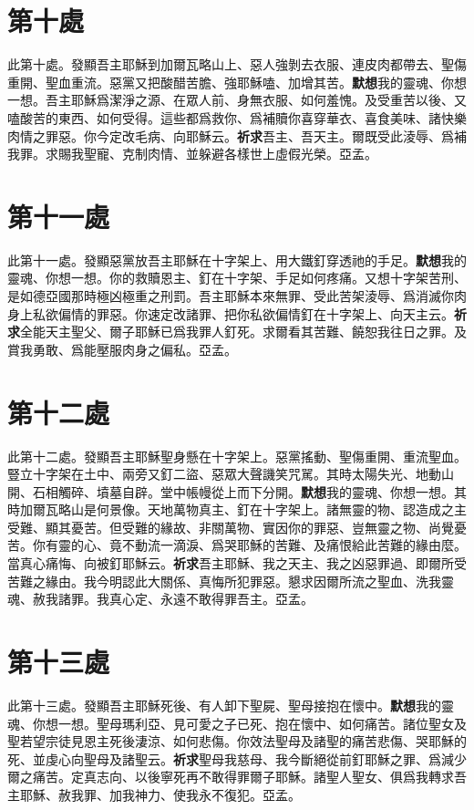 \section*{第十處}
此第十處。發顯吾主耶穌到加爾瓦略山上、惡人強剝去衣服、連皮肉都帶去、聖傷重開、聖血重流。惡黨又把酸醋苦膽、強耶穌嗑、加增其苦。\cspace\textbf{默想}我的靈魂、你想一想。吾主耶穌爲潔淨之源、在眾人前、身無衣服、如何羞愧。及受重苦以後、又嗑酸苦的東西、如何受得。這些都爲救你、爲補贖你喜穿華衣、喜食美味、諸快樂肉情之罪惡。你今定改毛病、向耶穌云。\cspace\textbf{祈求}吾主、吾天主。爾既受此淩辱、爲補我罪。求賜我聖寵、克制肉情、並躲避各樣世上虛假光榮。{\cspace}亞孟。

\section*{第十一處}
此第十一處。發顯惡黨放吾主耶穌在十字架上、用大鐵釘穿透祂的手足。\cspace\textbf{默想}我的靈魂、你想一想。你的救贖恩主、釘在十字架、手足如何疼痛。又想十字架苦刑、是如德亞國那時極凶極重之刑罰。吾主耶穌本來無罪、受此苦架淩辱、爲消滅你肉身上私欲偏情的罪惡。你速定改諸罪、把你私欲偏情釘在十字架上、向天主云。\cspace\textbf{祈求}全能天主聖父、爾子耶穌已爲我罪人釘死。求爾看其苦難、饒恕我往日之罪。及賞我勇敢、爲能壓服肉身之偏私。{\cspace}亞孟。

\section*{第十二處}
此第十二處。發顯吾主耶穌聖身懸在十字架上。惡黨搖動、聖傷重開、重流聖血。豎立十字架在土中、兩旁又釘二盜、惡眾大聲譏笑咒駡。其時太陽失光、地動山開、石相觸碎、墳墓自辟。堂中帳幔從上而下分開。\cspace\textbf{默想}我的靈魂、你想一想。其時加爾瓦略山是何景像。天地萬物真主、釘在十字架上。諸無靈的物、認造成之主受難、顯其憂苦。但受難的緣故、非關萬物、實因你的罪惡、豈無靈之物、尚覺憂苦。你有靈的心、竟不動流一滴淚、爲哭耶穌的苦難、及痛恨給此苦難的緣由麼。當真心痛悔、向被釘耶穌云。\cspace\textbf{祈求}吾主耶穌、我之天主、我之凶惡罪過、即爾所受苦難之緣由。我今明認此大關係、真悔所犯罪惡。懇求因爾所流之聖血、洗我靈魂、赦我諸罪。我真心定、永遠不敢得罪吾主。{\cspace}亞孟。

\section*{第十三處}
此第十三處。發顯吾主耶穌死後、有人卸下聖屍、聖母接抱在懷中。\cspace\textbf{默想}我的靈魂、你想一想。聖母瑪利亞、見可愛之子已死、抱在懷中、如何痛苦。諸位聖女及聖若望宗徒見恩主死後淒涼、如何悲傷。你效法聖母及諸聖的痛苦悲傷、哭耶穌的死、並虔心向聖母及諸聖云。\cspace\textbf{祈求}聖母我慈母、我今斷絕從前釘耶穌之罪、爲減少爾之痛苦。定真志向、以後寧死再不敢得罪爾子耶穌。諸聖人聖女、俱爲我轉求吾主耶穌、赦我罪、加我神力、使我永不復犯。{\cspace}亞孟。

